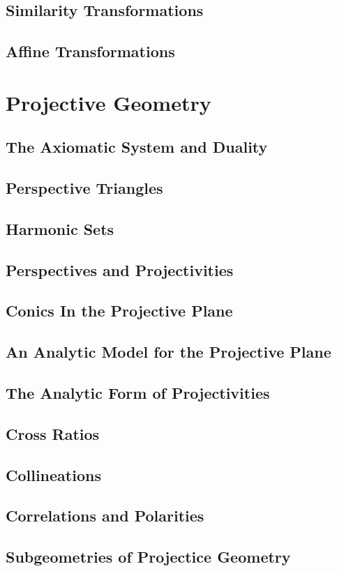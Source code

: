 \documentclass[12pt]{book}
\begin{document}
\section{Similarity Transformations}
\section{Affine Transformations}

\chapter{Projective Geometry}
\section{The Axiomatic System and Duality}
\section{Perspective Triangles}
\section{Harmonic Sets}
\section{Perspectives and Projectivities}
\section{Conics In the Projective Plane}
\section{An Analytic Model for the Projective Plane}
\section{The Analytic Form of Projectivities}
\section{Cross Ratios}
\section{Collineations}
\section{Correlations and Polarities}
\section{Subgeometries of Projectice Geometry}
\end{document}
